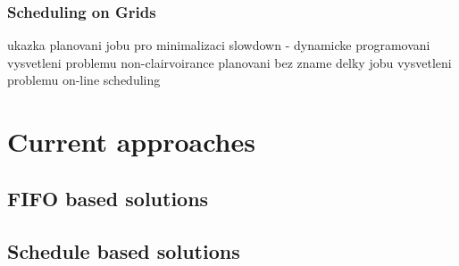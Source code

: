 \begin{frame}
	\frametitle{Scheduling on Grids}
	ukazka planovani jobu pro minimalizaci slowdown - dynamicke programovani
	vysvetleni problemu non-clairvoirance
	planovani bez zname delky jobu
	vysvetleni problemu on-line scheduling
\end{frame}


\section{Current approaches}
\subsection{FIFO based solutions}
\subsection{Schedule based solutions}



% 





